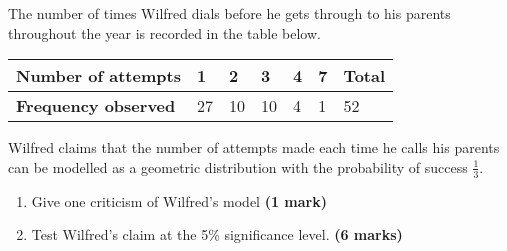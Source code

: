 \documentclass[fleqn]{article}
\begin{document}
\begin{enumerate}
        The number of times Wilfred dials before he gets through to his parents throughout the year is recorded in the table below.\vspace{-1mm}
        \begin{center}
            \begin{tabularx}{0.75\textwidth}{|X|*6{P{12mm}|}}
                \hline
                \textbf{Number of attempts} & 1  & 2  & 3  & 4 & 7 & \textbf{Total}  \\\hline
                \textbf{Frequency observed} & 27 & 10 & 10 & 4 & 1 & 52              \\\hline
            \end{tabularx}
        \end{center}\vspace{3mm}
        Wilfred claims that the number of attempts made each time he calls his parents can be modelled as a geometric distribution with the probability of success $\frac{1}{3}$.
        \begin{enumerate}[label=\bfseries \alph*\space ]
            \item Give one criticism of Wilfred's model \hfill\textbf{(1 mark)}
            \item Test Wilfred's claim at the 5\% significance level. \hfill\textbf{(6 marks)}
        \end{enumerate}
\end{enumerate}
\newpage
\end{document}
